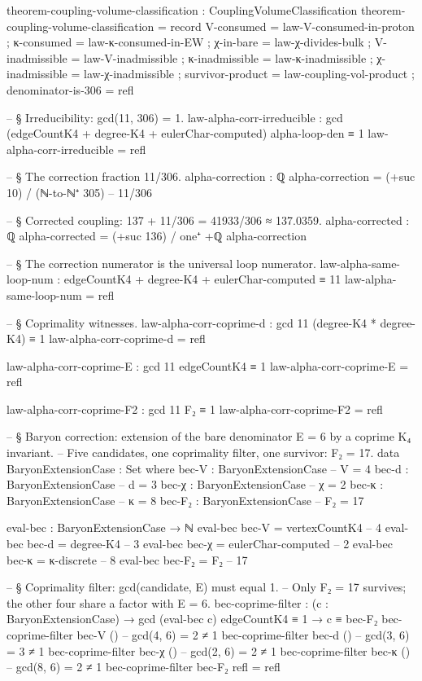\documentclass[11pt,a4paper]{book}
\begin{document}
\begin{code}
theorem-coupling-volume-classification : CouplingVolumeClassification
theorem-coupling-volume-classification = record
  { V-consumed      = law-V-consumed-in-proton
  ; κ-consumed      = law-κ-consumed-in-EW
  ; χ-in-bare       = law-χ-divides-bulk
  ; V-inadmissible  = law-V-inadmissible
  ; κ-inadmissible  = law-κ-inadmissible
  ; χ-inadmissible  = law-χ-inadmissible
  ; survivor-product = law-coupling-vol-product
  ; denominator-is-306 = refl
  }

-- § Irreducibility: gcd(11, 306) = 1.
law-alpha-corr-irreducible : gcd (edgeCountK4 + degree-K4 + eulerChar-computed) alpha-loop-den ≡ 1
law-alpha-corr-irreducible = refl

-- § The correction fraction 11/306.
alpha-correction : ℚ
alpha-correction = (+suc 10) / (ℕ-to-ℕ⁺ 305)    -- 11/306

-- § Corrected coupling: 137 + 11/306 = 41933/306 ≈ 137.0359.
alpha-corrected : ℚ
alpha-corrected = (+suc 136) / one⁺ +ℚ alpha-correction

-- § The correction numerator is the universal loop numerator.
law-alpha-same-loop-num : edgeCountK4 + degree-K4 + eulerChar-computed ≡ 11
law-alpha-same-loop-num = refl

-- § Coprimality witnesses.
law-alpha-corr-coprime-d : gcd 11 (degree-K4 * degree-K4) ≡ 1
law-alpha-corr-coprime-d = refl

law-alpha-corr-coprime-E : gcd 11 edgeCountK4 ≡ 1
law-alpha-corr-coprime-E = refl

law-alpha-corr-coprime-F2 : gcd 11 F₂ ≡ 1
law-alpha-corr-coprime-F2 = refl

-- § Baryon correction: extension of the bare denominator E = 6 by a coprime K₄ invariant.
-- Five candidates, one coprimality filter, one survivor: F₂ = 17.
data BaryonExtensionCase : Set where
  bec-V  : BaryonExtensionCase   -- V = 4
  bec-d  : BaryonExtensionCase   -- d = 3
  bec-χ  : BaryonExtensionCase   -- χ = 2
  bec-κ  : BaryonExtensionCase   -- κ = 8
  bec-F₂ : BaryonExtensionCase   -- F₂ = 17

eval-bec : BaryonExtensionCase → ℕ
eval-bec bec-V  = vertexCountK4        -- 4
eval-bec bec-d  = degree-K4            -- 3
eval-bec bec-χ  = eulerChar-computed   -- 2
eval-bec bec-κ  = κ-discrete           -- 8
eval-bec bec-F₂ = F₂                   -- 17

-- § Coprimality filter: gcd(candidate, E) must equal 1.
-- Only F₂ = 17 survives; the other four share a factor with E = 6.
bec-coprime-filter :
  (c : BaryonExtensionCase) →
  gcd (eval-bec c) edgeCountK4 ≡ 1 →
  c ≡ bec-F₂
bec-coprime-filter bec-V  ()   -- gcd(4, 6) = 2 ≠ 1
bec-coprime-filter bec-d  ()   -- gcd(3, 6) = 3 ≠ 1
bec-coprime-filter bec-χ  ()   -- gcd(2, 6) = 2 ≠ 1
bec-coprime-filter bec-κ  ()   -- gcd(8, 6) = 2 ≠ 1
bec-coprime-filter bec-F₂ refl = refl


\end{code}
\end{document}
